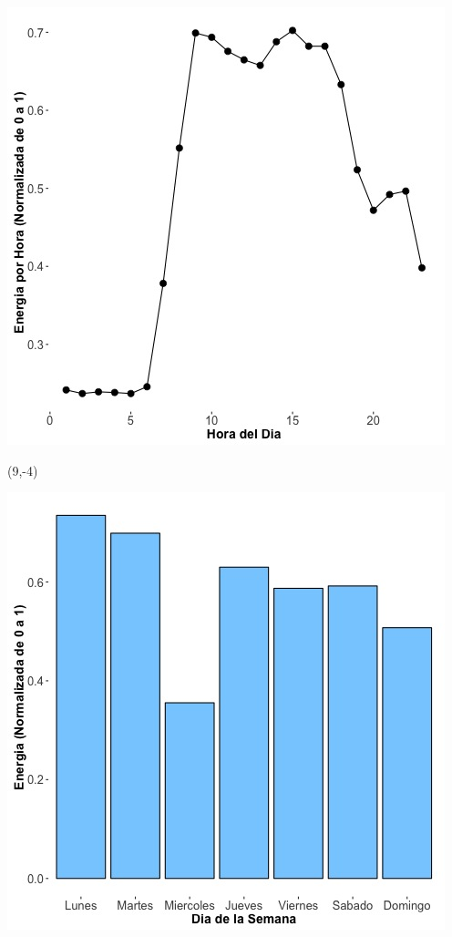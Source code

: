 \documentclass{article}\usepackage[]{graphicx}\usepackage[]{color}
\newenvironment{knitrout}{}{} %
\begin{document}
\begin{knitrout}
\color{fgcolor}
\includegraphics[scale=0.65]{figure/A25_plot_norm_median} 
\end{knitrout}


 \begin{textblock}{1}(9,-4)
\begin{minipage}{20em}
\begingroup

\endgroup
\end{minipage}
\end{textblock}


\begin{knitrout}
\color{fgcolor}
\includegraphics[scale=0.65]{figure/A25_day_of_week_plot} 
\end{knitrout}
\end{document}
